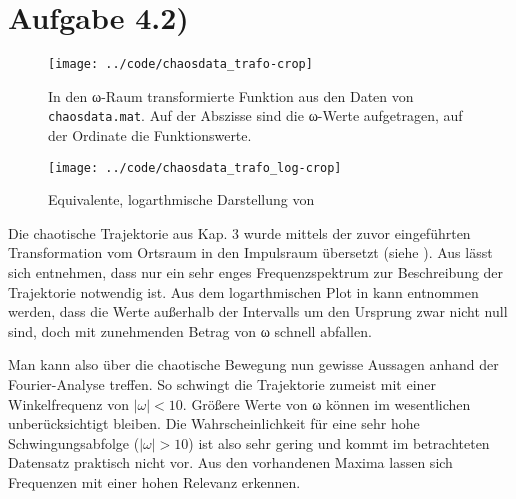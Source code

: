 \section*{Aufgabe 4.2)}



\begin{figure}[htb]
\centering
  \texttt{[image: ../code/chaosdata\_trafo-crop]}
  \caption{In den ω-Raum transformierte Funktion aus den Daten von \texttt{chaosdata.mat}. Auf der Abszisse sind
  die ω-Werte aufgetragen, auf der Ordinate die Funktionswerte.}
  \label{fig:chaos}
\end{figure}

\begin{figure}[htb]
\centering
  \texttt{[image: ../code/chaosdata\_trafo\_log-crop]}
  \caption{Equivalente, logarthmische Darstellung von }
  \label{fig:chaoslog}
\end{figure}

Die chaotische Trajektorie aus Kap. 3 wurde mittels der zuvor eingeführten
Transformation vom Ortsraum in den Impulsraum übersetzt (siehe ). Aus  lässt
sich entnehmen, dass nur ein sehr enges Frequenzspektrum zur Beschreibung der
Trajektorie notwendig ist. Aus dem logarthmischen Plot in  kann
entnommen werden, dass die Werte außerhalb der Intervalls um den Ursprung zwar nicht
null sind, doch mit zunehmenden Betrag von ω schnell abfallen.

Man kann also über die chaotische Bewegung nun gewisse Aussagen anhand der
Fourier-Analyse treffen. So schwingt die Trajektorie zumeist mit einer
Winkelfrequenz von $|ω| < 10$. Größere Werte von ω können im wesentlichen
unberücksichtigt bleiben. Die Wahrscheinlichkeit für eine sehr hohe Schwingungsabfolge
($|ω| > 10$) ist also sehr gering und kommt im betrachteten Datensatz
praktisch nicht vor. Aus den vorhandenen Maxima lassen sich Frequenzen mit einer
hohen Relevanz erkennen.